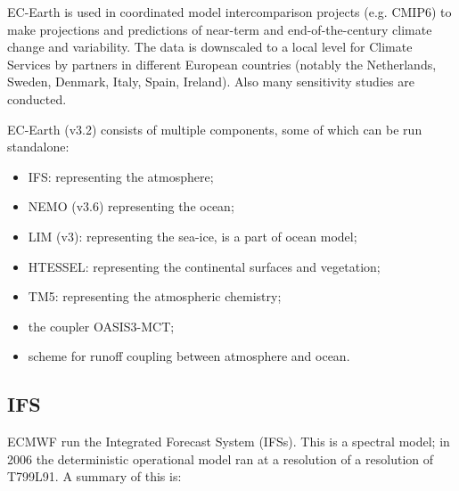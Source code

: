 EC-Earth is used in coordinated model intercomparison projects (e.g. CMIP6) to make projections and predictions 
of near-term and end-of-the-century climate change and variability. The data is downscaled to a local level for 
Climate Services by partners in different European countries (notably the Netherlands, Sweden, Denmark, Italy, Spain, 
Ireland). Also many sensitivity studies are conducted.


EC-Earth (v3.2) consists of multiple components, some of which can be run standalone:
\begin{itemize}
    \item IFS: representing the atmosphere;
    \item \acrshort{NEMO} (v3.6) representing the ocean;
    \item LIM (v3): representing the sea-ice, is a part of ocean model;
    \item HTESSEL: representing the continental surfaces and vegetation;
    \item TM5: representing the atmospheric chemistry;
    \item the coupler OASIS3-MCT;
    \item scheme for runoff coupling between atmosphere and ocean.
\end{itemize}

\subsection{IFS}
ECMWF run the Integrated Forecast System (\glspl{IFS}). 
\iffalse
This is a spectral model; in 2006 the deterministic operational model ran at a resolution of 
a resolution of T799L91. A summary of this is:

